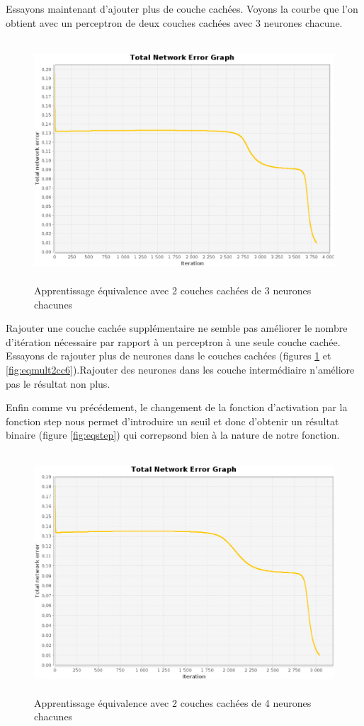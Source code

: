 \documentclass[twoside,openright,a4paper,11pt,french]{article}
\begin{document}
Essayons maintenant d'ajouter plus de couche cachées. Voyons la
courbe que l'on obtient avec un perceptron de deux couches cachées avec 3 
neurones chacune.

\begin{figure}[ht]
\centering
\includegraphics[width=12cm,height=9cm]{./pics/eq/multi_3_3_def.eps}
\caption{Apprentissage équivalence avec 2 couches cachées de 3 neurones chacunes}
\end{figure}


Rajouter une couche cachée supplémentaire ne semble pas améliorer le nombre d'itération
nécessaire par rapport à un perceptron à une seule couche cachée.  Essayons de
rajouter plus de neurones dans le couches cachées (figures \ref{fig:eqmult2cc4}
et \ref{fig:eqmult2cc6}).Rajouter des neurones dans les couche intermédiaire
n'améliore pas le résultat non plus.

Enfin comme vu précédement, le changement de la fonction d'activation par la
fonction step nous permet d'introduire un seuil et donc d'obtenir un résultat
binaire (figure \ref{fig:eqstep}) qui correpsond bien à la nature de notre
fonction. 


\begin{figure}[ht]
\centering
\includegraphics[width=12cm,height=9cm]{./pics/eq/multi_4_4_def.eps}
\caption{Apprentissage équivalence avec 2 couches cachées de 4 neurones chacunes}
\label{fig:eqmult2cc4}
\end{figure}
\end{document}
